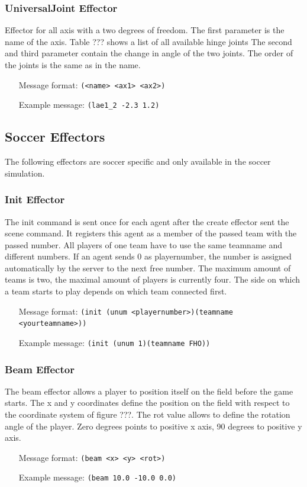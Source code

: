 \subsubsection{UniversalJoint Effector}
Effector for all axis with a two degrees of freedom.
The first parameter is the name of the axis. Table ??? shows a list of all
available hinge joints
The second and third parameter contain the change in angle of the two joints.
The order of the joints is the same as in the name.
\begin{itemize}
	\item[Message format:] \texttt{(<name> <ax1> <ax2>)}
	\item[Example message:] \texttt{(lae1\_2 -2.3 1.2)}
\end{itemize}

\subsection{Soccer Effectors}
The following effectors are soccer specific and only available in the soccer
simulation.

\subsubsection{Init Effector}
The init command is sent once for each agent after the create effector sent the
scene command. It registers this agent as a member of the passed team with the passed number.
All players of one team have to use the same teamname and different numbers.
If an agent sends 0 as playernumber, the number is assigned automatically by
the server to the next free number. The maximum amount of teams is two, the
maximal amount of players is currently four.
The side on which a team starts to play depends on which team connected
first.
\begin{itemize}
	\item[Message format:] \texttt{(init (unum <playernumber>)(teamname
	<yourteamname>))}
	\item[Example message:] \texttt{(init (unum 1)(teamname FHO))}
\end{itemize}

\subsubsection{Beam Effector}
The beam effector allows a player to position itself on the field before the
game starts. The x and y coordinates define the position on the field with
respect to the coordinate system of figure ???. The rot value allows to define
the rotation angle of the player. Zero degrees points to positive x axis, 90
degrees to positive y axis.
\begin{itemize}
	\item[Message format:] \texttt{(beam <x> <y> <rot>)}
	\item[Example message:] \texttt{(beam 10.0 -10.0 0.0)}
\end{itemize}

